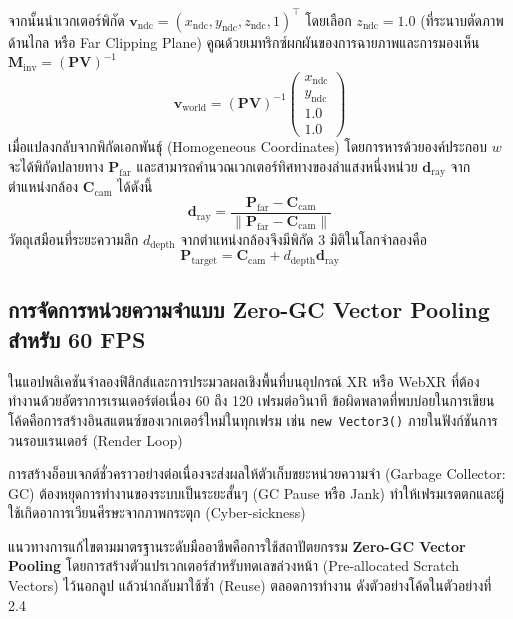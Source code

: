 จากนั้นนำเวกเตอร์พิกัด $\mathbf{v}_{\text{ndc}} = (x_{\text{ndc}}, y_{\text{ndc}}, z_{\text{ndc}}, 1)^{\top}$ โดยเลือก $z_{\text{ndc}} = 1.0$ (ที่ระนาบตัดภาพด้านไกล หรือ Far Clipping Plane) คูณด้วยเมทริกซ์ผกผันของการฉายภาพและการมองเห็น $\mathbf{M}_{\text{inv}} = (\mathbf{P} \mathbf{V})^{-1}$
\begin{equation}
\mathbf{v}_{\text{world}} = (\mathbf{P} \mathbf{V})^{-1} \begin{pmatrix} x_{\text{ndc}} \\ y_{\text{ndc}} \\ 1.0 \\ 1.0 \end{pmatrix}
\end{equation}
เมื่อแปลงกลับจากพิกัดเอกพันธุ์ (Homogeneous Coordinates) โดยการหารด้วยองค์ประกอบ $w$ จะได้พิกัดปลายทาง $\mathbf{P}_{\text{far}}$ และสามารถคำนวณเวกเตอร์ทิศทางของลำแสงหนึ่งหน่วย $\mathbf{d}_{\text{ray}}$ จากตำแหน่งกล้อง $\mathbf{C}_{\text{cam}}$ ได้ดังนี้
\begin{equation}
\mathbf{d}_{\text{ray}} = \frac{\mathbf{P}_{\text{far}} - \mathbf{C}_{\text{cam}}}{\|\mathbf{P}_{\text{far}} - \mathbf{C}_{\text{cam}}\|}
\end{equation}
วัตถุเสมือนที่ระยะความลึก $d_{\text{depth}}$ จากตำแหน่งกล้องจึงมีพิกัด 3 มิติในโลกจำลองคือ
\begin{equation}
\mathbf{P}_{\text{target}} = \mathbf{C}_{\text{cam}} + d_{\text{depth}} \mathbf{d}_{\text{ray}}
\end{equation}

\subsection{การจัดการหน่วยความจำแบบ Zero-GC Vector Pooling สำหรับ 60 FPS}

ในแอปพลิเคชันจำลองฟิสิกส์และการประมวลผลเชิงพื้นที่บนอุปกรณ์ XR หรือ WebXR ที่ต้องทำงานด้วยอัตราการเรนเดอร์ต่อเนื่อง 60 ถึง 120 เฟรมต่อวินาที ข้อผิดพลาดที่พบบ่อยในการเขียนโค้ดคือการสร้างอินสแตนซ์ของเวกเตอร์ใหม่ในทุกเฟรม เช่น \texttt{new Vector3()} ภายในฟังก์ชันการวนรอบเรนเดอร์ (Render Loop)

การสร้างอ็อบเจกต์ชั่วคราวอย่างต่อเนื่องจะส่งผลให้ตัวเก็บขยะหน่วยความจำ (Garbage Collector: GC) ต้องหยุดการทำงานของระบบเป็นระยะสั้นๆ (GC Pause หรือ Jank) ทำให้เฟรมเรตตกและผู้ใช้เกิดอาการเวียนศีรษะจากภาพกระตุก (Cyber-sickness)

แนวทางการแก้ไขตามมาตรฐานระดับมืออาชีพคือการใช้สถาปัตยกรรม \textbf{Zero-GC Vector Pooling} โดยการสร้างตัวแปรเวกเตอร์สำหรับทดเลขล่วงหน้า (Pre-allocated Scratch Vectors) ไว้นอกลูป แล้วนำกลับมาใช้ซ้ำ (Reuse) ตลอดการทำงาน ดังตัวอย่างโค้ดในตัวอย่างที่ 2.4

